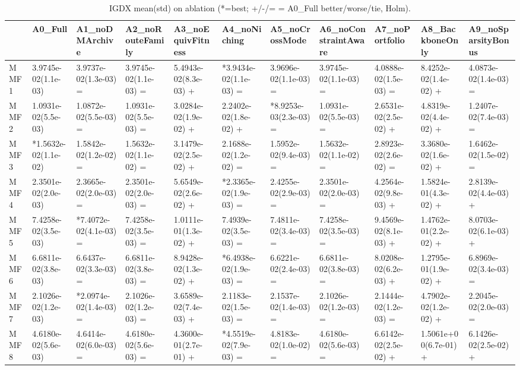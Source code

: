 \begin{table}[t]
\centering
\caption{IGDX mean(std) on ablation (*=best; +/-/= = A0_Full better/worse/tie, Holm).}
\label{tab:ablation_IGDX}
\begin{tabular}{lllllllllll}
\toprule
 & A0\_Full & A1\_noDMArchive & A2\_noRouteFamily & A3\_noEquivFitness & A4\_noNiching & A5\_noCrossMode & A6\_noConstraintAware & A7\_noPortfolio & A8\_BackboneOnly & A9\_noSparsityBonus \\
\midrule
MMF1 & 3.9745e-02(1.1e-03) & 3.9737e-02(1.3e-03) = & 3.9745e-02(1.1e-03) = & 5.4943e-02(8.3e-03) + & *3.9434e-02(1.1e-03) = & 3.9696e-02(1.1e-03) = & 3.9745e-02(1.1e-03) = & 4.0888e-02(1.5e-03) = & 8.4252e-02(1.4e-02) + & 4.0873e-02(1.4e-03) = \\
MMF2 & 1.0931e-02(5.5e-03) & 1.0872e-02(5.5e-03) = & 1.0931e-02(5.5e-03) = & 3.0284e-02(1.9e-02) + & 2.2402e-02(1.8e-02) + & *8.9253e-03(2.3e-03) = & 1.0931e-02(5.5e-03) = & 2.6531e-02(2.5e-02) + & 4.8319e-02(4.4e-02) + & 1.2407e-02(7.4e-03) = \\
MMF3 & *1.5632e-02(1.1e-02) & 1.5842e-02(1.2e-02) = & 1.5632e-02(1.1e-02) = & 3.1479e-02(2.5e-02) + & 2.1688e-02(1.2e-02) = & 1.5952e-02(9.4e-03) = & 1.5632e-02(1.1e-02) = & 2.8923e-02(2.6e-02) = & 3.3680e-02(1.6e-02) + & 1.6462e-02(1.5e-02) = \\
MMF4 & 2.3501e-02(2.0e-03) & 2.3665e-02(2.0e-03) = & 2.3501e-02(2.0e-03) = & 5.6549e-02(2.6e-02) + & *2.3365e-02(1.9e-03) = & 2.4255e-02(2.9e-03) = & 2.3501e-02(2.0e-03) = & 4.2564e-02(9.8e-03) + & 1.5824e-01(4.3e-02) + & 2.8139e-02(4.4e-03) + \\
MMF5 & 7.4258e-02(3.5e-03) & *7.4072e-02(4.1e-03) = & 7.4258e-02(3.5e-03) = & 1.0111e-01(1.3e-02) + & 7.4939e-02(3.5e-03) = & 7.4811e-02(3.4e-03) = & 7.4258e-02(3.5e-03) = & 9.4569e-02(8.1e-03) + & 1.4762e-01(2.2e-02) + & 8.0703e-02(6.1e-03) + \\
MMF6 & 6.6811e-02(3.8e-03) & 6.6437e-02(3.3e-03) = & 6.6811e-02(3.8e-03) = & 8.9428e-02(1.3e-02) + & *6.4938e-02(1.9e-03) = & 6.6221e-02(2.4e-03) = & 6.6811e-02(3.8e-03) = & 8.0208e-02(6.2e-03) + & 1.2795e-01(1.9e-02) + & 6.8969e-02(3.4e-03) = \\
MMF7 & 2.1026e-02(1.2e-03) & *2.0974e-02(1.4e-03) = & 2.1026e-02(1.2e-03) = & 3.6589e-02(7.4e-03) + & 2.1183e-02(1.5e-03) = & 2.1537e-02(1.4e-03) = & 2.1026e-02(1.2e-03) = & 2.1444e-02(1.2e-03) = & 4.7902e-02(1.2e-02) + & 2.2045e-02(2.0e-03) = \\
MMF8 & 4.6180e-02(5.6e-03) & 4.6414e-02(6.0e-03) = & 4.6180e-02(5.6e-03) = & 4.3600e-01(2.7e-01) + & *4.5519e-02(7.9e-03) = & 4.8183e-02(1.0e-02) = & 4.6180e-02(5.6e-03) = & 6.6142e-02(2.5e-02) + & 1.5061e+00(6.7e-01) + & 6.1426e-02(2.5e-02) + \\
\bottomrule
\end{tabular}
\end{table}
